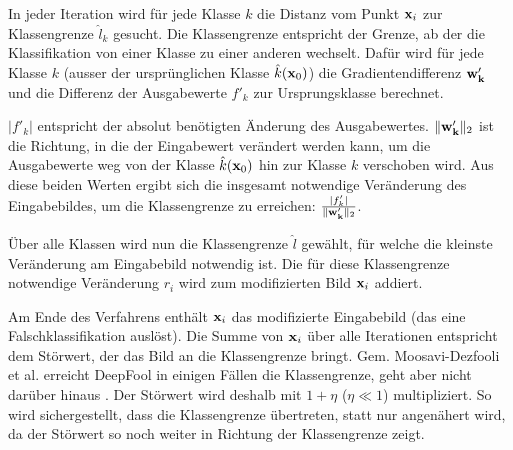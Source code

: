 \documentclass{FFHS_Thesis_Additions/ffhsthesis}
\begin{document}
In jeder Iteration wird für jede Klasse $k$ die Distanz vom Punkt $\bold{x}_i$ zur Klassengrenze $\hat{l}_k$ gesucht. 
Die Klassengrenze entspricht der Grenze, ab der die Klassifikation von einer Klasse zu einer anderen wechselt. 
Dafür wird für jede Klasse $k$ (ausser der ursprünglichen Klasse $\hat{k}(\bold{x}_0)$) die Gradientendifferenz $\bold{w'_k}$ und die Differenz der Ausgabewerte $f'_k$ zur Ursprungsklasse berechnet.

$\vert f'_k \vert$ entspricht der absolut benötigten Änderung des Ausgabewertes. 
$\Vert \bold{w'_k} \Vert_2$ ist die Richtung, in die der Eingabewert verändert werden kann, um die Ausgabewerte weg von der Klasse $\hat{k}(\bold{x}_0)$ hin zur Klasse $k$ verschoben wird. 
Aus diese beiden Werten ergibt sich die insgesamt notwendige Veränderung des Eingabebildes, um die Klassengrenze zu erreichen: $ \frac{ \vert f'_k \vert}{\Vert \bold{w'_k} \Vert_2}$.

Über alle Klassen wird nun die Klassengrenze $\hat{l}$ gewählt, für welche die kleinste Veränderung am Eingabebild notwendig ist. 
Die für diese Klassengrenze notwendige Veränderung $r_i$ wird zum modifizierten Bild $\bold{x}_i$ addiert.

Am Ende des Verfahrens enthält $\bold{x}_i$ das modifizierte Eingabebild (das eine Falschklassifikation auslöst). 
Die Summe von $\bold{x}_i$ über alle Iterationen entspricht dem Störwert, der das Bild an die Klassengrenze bringt. 
Gem. Moosavi-Dezfooli et al. erreicht DeepFool in einigen Fällen die Klassengrenze, geht aber nicht darüber hinaus \cite{moosavi-dezfooli_deepfool_2016}. 
Der Störwert wird deshalb mit $1+\eta$ ($\eta \ll 1$) multipliziert. 
So wird sichergestellt, dass die Klassengrenze übertreten, statt nur angenähert wird, da der Störwert so noch weiter in Richtung der Klassengrenze zeigt.
\end{document}
